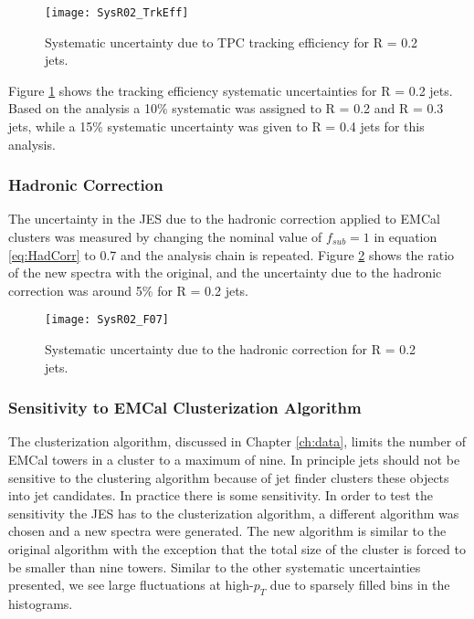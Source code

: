 \begin{figure}[t!]
\texttt{[image: SysR02\_TrkEff]}
\centering
\caption{Systematic uncertainty due to TPC tracking efficiency for R = 0.2 jets.}
\label{fig:trkbodysys}
\end{figure}


Figure \ref{fig:trkbodysys} shows the tracking efficiency systematic uncertainties for R = 0.2 jets.  Based on the analysis a 10\% systematic was assigned to R = 0.2 and R = 0.3 jets, while a 15\% systematic uncertainty was given to R = 0.4 jets for this analysis.

\subsubsection{Hadronic Correction}



The uncertainty in the JES due to the hadronic correction applied to EMCal clusters was measured by changing the nominal value of $f_{sub} = 1$ in equation \ref{eq:HadCorr} to 0.7 and the analysis chain is repeated.  Figure \ref{fig:hadeff} shows the ratio of the new spectra with the original, and the uncertainty due to the hadronic correction was around 5\% for R = 0.2 jets.

\begin{figure}[t!]
\texttt{[image: SysR02\_F07]}
\centering
\caption{Systematic uncertainty due to the hadronic correction for R = 0.2 jets.}
\label{fig:hadeff}
\end{figure}

\subsubsection{Sensitivity to EMCal Clusterization Algorithm}
The clusterization algorithm, discussed in Chapter \ref{ch:data}, limits the number of EMCal towers in a cluster to a maximum of nine.  In principle jets should not be sensitive to the clustering algorithm because of jet finder clusters these objects into jet candidates. In practice there is some sensitivity.  In order to test the sensitivity the JES has to the clusterization algorithm, a different algorithm was chosen and a new spectra were generated.  The new algorithm is similar to the original algorithm with the exception that the total size of the cluster is forced to be smaller than nine towers.  Similar to the other systematic uncertainties presented, we see large fluctuations at high-$p_{T}$ due to sparsely filled bins in the histograms.  

